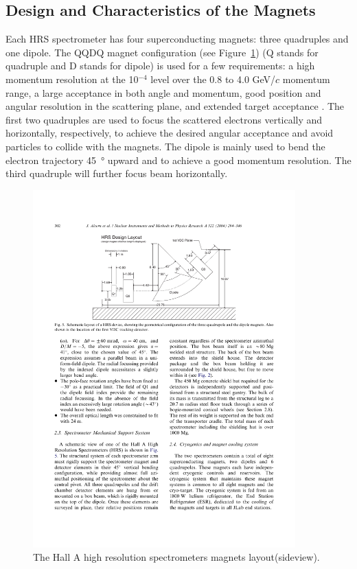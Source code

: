 \subsection{Design and Characteristics of the Magnets}
Each HRS spectrometer has four superconducting magnets: three quadruples and one dipole.
The QQDQ magnet configuration (see Figure~\ref{fig:QQDQ_config}) (Q stands for quadruple and D stands for dipole) is used for a few requirements:
a high momentum resolution at the 10$^{-4}$ level over the 0.8 to 4.0 GeV/$c$ momentum range, a large acceptance
in both angle and momentum, good position and angular resolution in the scattering plane, and extended target
acceptance \cite{Alcorn2004}.
The first two quadruples are used to focus the scattered electrons vertically and horizontally, respectively,
to achieve the desired angular acceptance and avoid particles to collide with the magnets.
The dipole is mainly used to bend the electron trajectory \SI{45}{\degree} upward and to achieve a good
momentum resolution. The third quadruple will further focus beam horizontally. 

\begin{figure}[tb!]
\centering
\includegraphics[width=0.9\textwidth]{figs/HRS.pdf}
\caption[HRS magnets layout]{The Hall A high resolution spectrometers magnets layout(sideview).  \label{fig:QQDQ_config}}
\end{figure}


